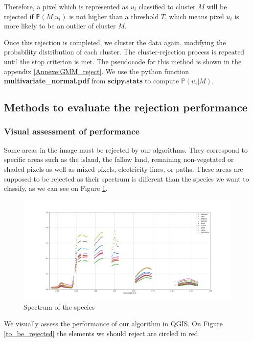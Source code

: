 \documentclass{siamart171218}
\begin{document}
Therefore, a pixel which is represented as $u_i$ classified to cluster $M$ will be rejected if $ \mathbb{P}(M|u_i)$ is not higher than a threshold $T$, which means pixel $u_i$ is more likely to be an outlier of cluster $M$.

Once this rejection is completed, we cluster the data again, modifying the probability
distribution of each cluster. The cluster-rejection process is repeated until the stop criterion is met. The pseudocode for this method is shown in the appendix \ref{Annexe:GMM_reject}. We use the python function \textbf{multivariate\_normal.pdf} from \textbf{scipy.stats} to compute  $\mathbb{P}(u_i|M)$. 

\subsection{Methods to evaluate the rejection performance}
\subsubsection{Visual assessment of performance}
Some areas in the image must be rejected by our algorithms. They correspond to specific areas such as the island, the fallow land, remaining non-vegetated or shaded pixels as well as mixed pixels, electricity lines, or paths. These areas are supposed to be rejected as their spectrum is different than the species we want to classify, as we can see on Figure \ref{spectrum}. 

\begin{figure}[H]
    \centering
    \includegraphics[width=16cm]{images/refl.png}
    \caption{Spectrum of the species}
    \label{spectrum}
\end{figure}

We visually assess the performance of our algorithm in QGIS. On Figure \ref{to_be_rejected} the elements we should reject are circled in red. 
\end{document}
